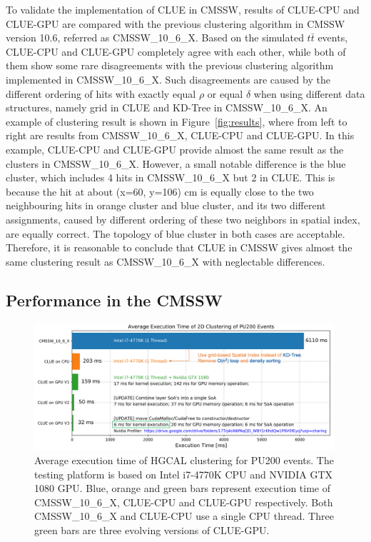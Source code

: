 To validate the implementation of CLUE in CMSSW, results of CLUE-CPU and CLUE-GPU are compared with the previous clustering algorithm in CMSSW version 10.6, referred as CMSSW\_10\_6\_X. Based on the simulated $t\bar{t}$ events, CLUE-CPU and CLUE-GPU completely agree with each other, while both of them show some rare disagreements with the previous clustering algorithm implemented in CMSSW\_10\_6\_X. Such disagreements are caused by the different ordering of hits with exactly equal $\rho$ or equal $\delta$ when using different data structures, namely grid in CLUE and KD-Tree in CMSSW\_10\_6\_X. An example of clustering result is shown in Figure~\ref{fig:results}, where from left to right are results from CMSSW\_10\_6\_X, CLUE-CPU and CLUE-GPU. In this example, CLUE-CPU and CLUE-GPU provide almost the same result as the clusters in CMSSW\_10\_6\_X. However, a small notable difference is the blue cluster, which includes 4 hits in CMSSW\_10\_6\_X but 2 in CLUE. This is because the hit at about (x=60, y=106) cm is equally close to the two neighbouring hits in orange cluster and blue cluster, and its two different assignments, caused by different ordering of these two neighbors in spatial index, are equally correct. The topology of blue cluster in both cases are acceptable. Therefore, it is reasonable to conclude that CLUE in CMSSW gives almost the same clustering result as CMSSW\_10\_6\_X with neglectable differences.





\subsection{Performance in the CMSSW}


\begin{figure}[ht]
    \centering
    \includegraphics[trim=0cm 0cm 0cm 0cm, clip,width=0.99\textwidth]{chapters/HGCal/figures/chep/performance.png}
    \caption{ 
    Average execution time of HGCAL clustering for PU200 events. The testing platform is based on Intel i7-4770K CPU and NVIDIA GTX 1080 GPU. Blue, orange and green bars represent execution time of CMSSW\_10\_6\_X, CLUE-CPU and CLUE-GPU respectively. Both CMSSW\_10\_6\_X and CLUE-CPU use a single CPU thread. Three green bars are three evolving versions of CLUE-GPU.
    }
    \label{fig:performance}
\end{figure}

